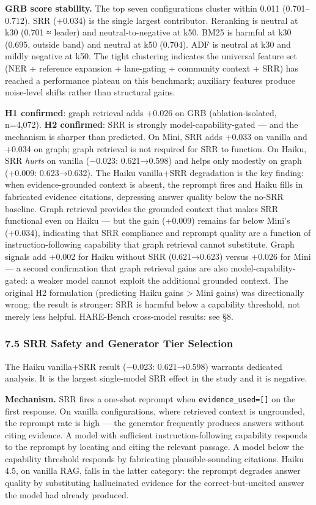\textbf{GRB score stability.} The top seven configurations cluster within 0.011 (0.701--0.712). SRR (+0.034) is the single largest contributor. Reranking is neutral at k30 (0.701 ≈ leader) and neutral-to-negative at k50. BM25 is harmful at k30 (0.695, outside band) and neutral at k50 (0.704). ADF is neutral at k30 and mildly negative at k50. The tight clustering indicates the universal feature set (NER + reference expansion + lane-gating + community context + SRR) has reached a performance plateau on this benchmark; auxiliary features produce noise-level shifts rather than structural gains.

\textbf{H1 confirmed}: graph retrieval adds +0.026 on GRB (ablation-isolated, n=4,072). \textbf{H2 confirmed}: SRR is strongly model-capability-gated --- and the mechanism is sharper than predicted. On Mini, SRR adds +0.033 on vanilla and +0.034 on graph; graph retrieval is not required for SRR to function. On Haiku, SRR \emph{hurts} on vanilla (−0.023: 0.621→0.598) and helps only modestly on graph (+0.009: 0.623→0.632). The Haiku vanilla+SRR degradation is the key finding: when evidence-grounded context is absent, the reprompt fires and Haiku fills in fabricated evidence citations, depressing answer quality below the no-SRR baseline. Graph retrieval provides the grounded context that makes SRR functional even on Haiku --- but the gain (+0.009) remains far below Mini's (+0.034), indicating that SRR compliance and reprompt quality are a function of instruction-following capability that graph retrieval cannot substitute. Graph signals add +0.002 for Haiku without SRR (0.621→0.623) versus +0.026 for Mini --- a second confirmation that graph retrieval gains are also model-capability-gated: a weaker model cannot exploit the additional grounded context. The original H2 formulation (predicting Haiku gains \textgreater{} Mini gains) was directionally wrong; the result is stronger: SRR is harmful below a capability threshold, not merely less helpful. HARE-Bench cross-model results: see §8.

\subsubsection{7.5 SRR Safety and Generator Tier Selection}\label{srr-safety-and-generator-tier-selection}

The Haiku vanilla+SRR result (−0.023: 0.621→0.598) warrants dedicated analysis. It is the largest single-model SRR effect in the study and it is negative.

\textbf{Mechanism.} SRR fires a one-shot reprompt when \texttt{evidence\_used={[}{]}} on the first response. On vanilla configurations, where retrieved context is ungrounded, the reprompt rate is high --- the generator frequently produces answers without citing evidence. A model with sufficient instruction-following capability responds to the reprompt by locating and citing the relevant passage. A model below the capability threshold responds by fabricating plausible-sounding citations. Haiku 4.5, on vanilla RAG, falls in the latter category: the reprompt degrades answer quality by substituting hallucinated evidence for the correct-but-uncited answer the model had already produced.

